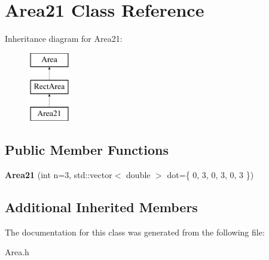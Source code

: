 \hypertarget{class_area21}{}\section{Area21 Class Reference}
\label{class_area21}
Inheritance diagram for Area21\+:\begin{figure}[H]
\begin{center}
\leavevmode
\includegraphics[height=3.000000cm]{class_area21}
\end{center}
\end{figure}
\subsection*{Public Member Functions}
\begin{DoxyCompactItemize}
\item 
\mbox{\label{class_area21_ad83b437747cc5b94620fedb938158d5e}} 
{\bfseries Area21} (int n=3, std\+::vector$<$ double $>$ dot=\{ 0, 3, 0, 3, 0, 3 \})
\end{DoxyCompactItemize}
\subsection*{Additional Inherited Members}


The documentation for this class was generated from the following file\+:\begin{DoxyCompactItemize}
\item 
Area.\+h\end{DoxyCompactItemize}
